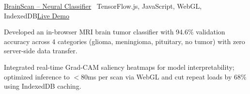 \begin{cvproject}{\href{https://grvchnx.github.io/brainscan/}{\uline{BrainScan -- Neural Classifier}} \textbar\ TensorFlow.js, JavaScript, WebGL, IndexedDB}{\href{https://grvchnx.github.io/brainscan/}{\uline{Live Demo}}}
    \item Developed an in-browser MRI brain tumor classifier with 94.6\% validation accuracy across 4 categories (glioma, meningioma, pituitary, no tumor) with zero server-side data transfer.
    \item Integrated real-time Grad-CAM saliency heatmaps for model interpretability; optimized inference to $<$80ms per scan via WebGL and cut repeat loads by 68\% using IndexedDB caching.
\end{cvproject}